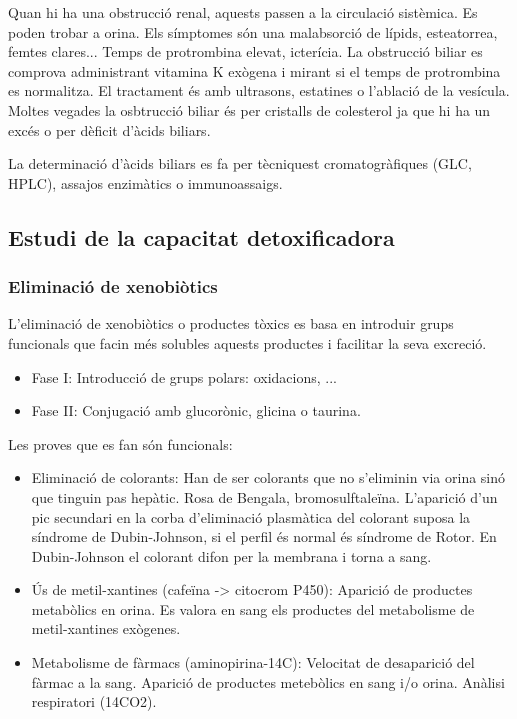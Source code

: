 Quan hi ha una obstrucció renal, aquests passen a la circulació
sistèmica. Es poden trobar a orina. Els símptomes són una malabsorció
de lípids, esteatorrea, femtes clares... Temps de protrombina elevat,
icterícia. La obstrucció biliar es comprova administrant vitamina K
exògena i mirant si el temps de protrombina es normalitza. El
tractament és amb ultrasons, estatines o l'ablació de la
vesícula. Moltes vegades la osbtrucció biliar és per cristalls de
colesterol ja que hi ha un excés o per dèficit d'àcids biliars.

La determinació d'àcids biliars es fa per tècniquest cromatogràfiques
(GLC, HPLC), assajos enzimàtics o immunoassaigs.

\subsection{Estudi de la capacitat detoxificadora}
\label{sec:estudi-de-la-1}

\subsubsection{Eliminació de xenobiòtics}
\label{sec:elim-de-xenob}
L'eliminació de xenobiòtics o productes tòxics es basa en introduir
grups funcionals que facin més solubles aquests productes i facilitar
la seva excreció.
\begin{itemize}
\item Fase I: Introducció de grups polars: oxidacions, ...
\item Fase II: Conjugació amb glucorònic, glicina o taurina.
\end{itemize}

Les proves que es fan són funcionals:
\begin{itemize}
\item Eliminació de colorants: Han de ser colorants que no s'eliminin
  via orina sinó que tinguin pas hepàtic. Rosa de Bengala,
  bromosulftaleïna. L'aparició d'un pic secundari en la corba
  d'eliminació plasmàtica del colorant suposa la síndrome de
  Dubin-Johnson, si el perfil és normal és síndrome de Rotor. En
  Dubin-Johnson el colorant difon per la membrana i torna a sang.

\item Ús de metil-xantines (cafeïna -> citocrom P450): Aparició de
  productes metabòlics en orina. Es valora en sang els productes del
  metabolisme de metil-xantines exògenes.

\item Metabolisme de fàrmacs (aminopirina-14C): Velocitat de
  desaparició del fàrmac a la sang. Aparició de productes metebòlics
  en sang i/o orina. Anàlisi respiratori (14CO2).
\end{itemize}

